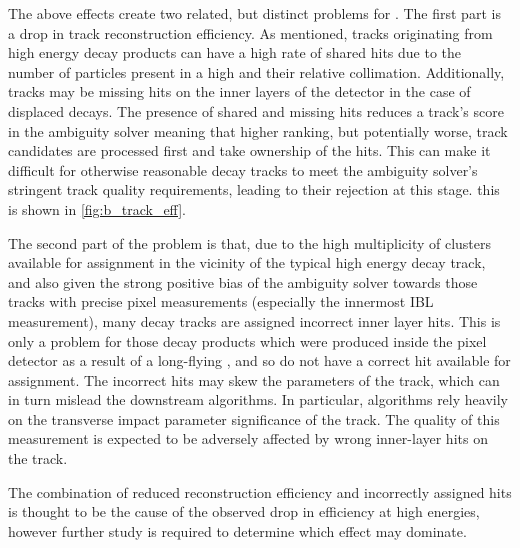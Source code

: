 The above effects create two related, but distinct problems for \btagging.
The first part is a drop in track reconstruction efficiency.
As mentioned, tracks originating from high energy \bhadron decay products can have a high rate of shared hits due to the number of particles present in a high \pT \bjet and their relative collimation.
Additionally, tracks may be missing hits on the inner layers of the detector in the case of displaced decays.
The presence of shared and missing hits reduces a track's score in the ambiguity solver meaning that higher ranking, but potentially worse, track candidates are processed first and take ownership of the hits.
This can make it difficult for otherwise reasonable \bhadron decay tracks to meet the ambiguity solver's stringent track quality requirements, leading to their rejection at this stage.
this is shown in \cref{fig:b_track_eff}.


The second part of the problem is that, due to the high multiplicity of clusters available for assignment in the vicinity of the typical high energy \bhadron decay track, and also given the strong positive bias of the ambiguity solver towards those tracks with precise pixel measurements (especially the innermost IBL measurement), many \bhadron decay tracks are assigned incorrect inner layer hits.
This is only a problem for those decay products which were produced inside the pixel detector as a result of a long-flying \bhadron, and so do not have a correct hit available for assignment.
The incorrect hits may skew the parameters of the track, which can in turn mislead the downstream \btagging algorithms.
In particular, \btagging algorithms rely heavily on the transverse impact parameter significance \dzerosig of the track.
The quality of this measurement is expected to be adversely affected by wrong inner-layer hits on the track. 

The combination of reduced reconstruction efficiency and incorrectly assigned hits is thought to be the cause of the observed drop in \btagging efficiency at high energies, however further study is required to determine which effect may dominate.








